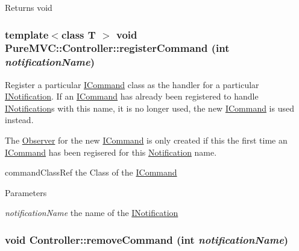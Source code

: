 \begin{DoxyReturn}{Returns}
void 
\end{DoxyReturn}
\hypertarget{class_pure_m_v_c_1_1_controller_a3e841777e38b7a571aa43aeb9ba40fed}{
\subsubsection[{registerCommand}]{\setlength{\rightskip}{0pt plus 5cm}template$<$class T $>$ void PureMVC::Controller::registerCommand (int {\em notificationName})}}
\label{class_pure_m_v_c_1_1_controller_a3e841777e38b7a571aa43aeb9ba40fed}


Register a particular {\ttfamily \hyperlink{class_pure_m_v_c_1_1_i_command}{ICommand}} class as the handler for a particular {\ttfamily \hyperlink{class_pure_m_v_c_1_1_i_notification}{INotification}}. If an {\ttfamily \hyperlink{class_pure_m_v_c_1_1_i_command}{ICommand}} has already been registered to handle {\ttfamily \hyperlink{class_pure_m_v_c_1_1_i_notification}{INotification}}s with this name, it is no longer used, the new {\ttfamily \hyperlink{class_pure_m_v_c_1_1_i_command}{ICommand}} is used instead.

The \hyperlink{class_pure_m_v_c_1_1_observer}{Observer} for the new \hyperlink{class_pure_m_v_c_1_1_i_command}{ICommand} is only created if this the first time an \hyperlink{class_pure_m_v_c_1_1_i_command}{ICommand} has been regisered for this \hyperlink{class_pure_m_v_c_1_1_notification}{Notification} name.

commandClassRef the {\ttfamily Class} of the {\ttfamily \hyperlink{class_pure_m_v_c_1_1_i_command}{ICommand}} 
\begin{DoxyParams}{Parameters}
\item[{\em notificationName}]the name of the {\ttfamily \hyperlink{class_pure_m_v_c_1_1_i_notification}{INotification}} \end{DoxyParams}
\hypertarget{class_pure_m_v_c_1_1_controller_a3d6617b86454aad7db4d47d32e692c64}{
\subsubsection[{removeCommand}]{\setlength{\rightskip}{0pt plus 5cm}void Controller::removeCommand (int {\em notificationName})}}
\label{class_pure_m_v_c_1_1_controller_a3d6617b86454aad7db4d47d32e692c64}


